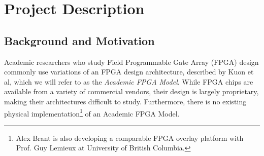 \section{Project Description}

\subsection{Background and Motivation}

%
%
%

Academic researchers who study Field Programmable Gate Array (FPGA) design commonly use variations of an FPGA design architecture, described by Kuon et al\cite{fpga}, which we will refer to as the \emph{Academic FPGA Model}.
While FPGA chips are available from a variety of commercial vendors, their design is largely proprietary, making their architectures difficult to study.\citationneeded
Furthermore, there is no existing physical implementation\footnote{Alex Brant is also developing a comparable FPGA overlay platform with Prof. Guy Lemieux at University of British Columbia.} of an Academic FPGA Model.

